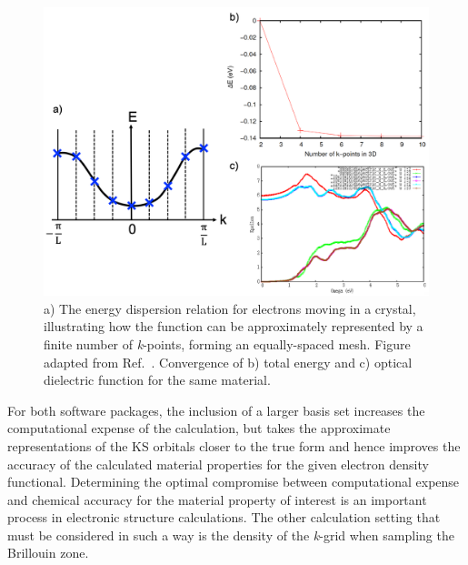 \documentclass[11pt, twoside]{report}
\begin{document}
\begin{figure}[h!]
  \centering
    \includegraphics[width=1.0\textwidth]{figures/new_k-point_sampling_update.png}
    \caption[a) The energy dispersion relation for electrons moving in a crystal, illustrating how the function can be approximately represented by a finite number of \textit{k}-points, forming an equally-spaced mesh. b) convergence of total energy and c) optical dielectric function for the same material.]{a) The energy dispersion relation for electrons moving in a crystal, illustrating how the function can be approximately represented by a finite number of \textit{k}-points, forming an equally-spaced mesh. Figure adapted from Ref.~. Convergence of b) total energy and c) optical dielectric function for the same material.}
  \label{k_sampling}
\end{figure}

For both software packages, the inclusion of a larger basis set increases the computational expense of the calculation, but takes the approximate representations of the KS orbitals closer to the true form and hence improves the accuracy of the calculated material properties for the given electron density functional. Determining the optimal compromise between computational expense and chemical accuracy for the material property of interest is an important process in electronic structure calculations. The other calculation setting that must be considered in such a way is the density of the \textit{k}-grid when sampling the Brillouin zone.
\end{document}
